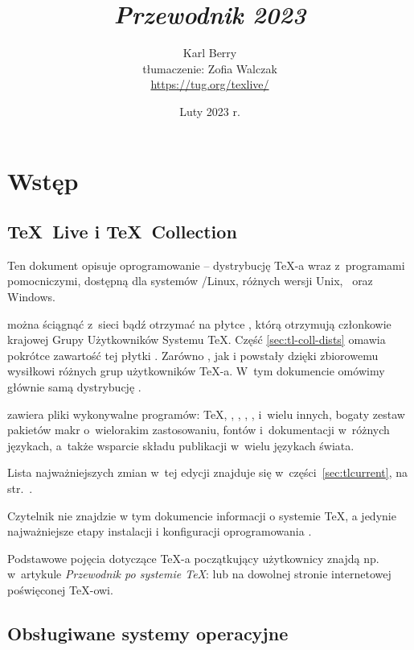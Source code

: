\documentclass{article}
\title{%
 {\huge \textit{Przewodnik \protect\TL{} 2023}}
}
\author{Karl Berry\\[2mm]
 tłumaczenie: Zofia Walczak\\[2mm]
 \url{https://tug.org/texlive/}
}
\date{Luty 2023 r.}
\begin{document}
\maketitle

\begin{multicols}{2}
\tableofcontents
\end{multicols}
\section{Wstęp}\label{sec:intro}

\subsection{\protect\TeX\protect\ Live i \protect\TeX\protect\ Collection}
Ten dokument  opisuje oprogramowanie \TL{} --
dystrybucję \TeX-a wraz z~programami pomocniczymi, dostępną dla systemów \GNU/Linux,
różnych wersji Unix, \macOS\ oraz Windows.

\TL{} można ściągnąć z~sieci bądź otrzymać na płytce \DVD \TK{}, którą otrzymują członkowie krajowej Grupy Użytkowników Systemu \TeX{}.
Część \ref{sec:tl-coll-dists} omawia pokrótce zawartość tej płytki \DVD.
Zarówno \TL{}, jak i \TK{} powstały dzięki zbiorowemu wysiłkowi różnych grup użytkowników \TeX-a.
W~tym dokumencie omówimy głównie samą dystrybucję \TL.

\TL{} zawiera pliki wykonywalne programów: \TeX{}, \LaTeXe{}, \ConTeXt,
\MF, \MP, \BibTeX{}
 i~wielu innych,  bogaty zestaw pakietów makr o~wielorakim
zastosowaniu,   fontów i~dokumentacji w~różnych językach, a~także  wsparcie składu
publikacji w~wielu językach świata.

Lista najważniejszych zmian w~tej edycji \TL{}
znajduje się w~części~\ref{sec:tlcurrent}, na str.~\pageref{sec:tlcurrent}.

Czytelnik nie znajdzie w tym dokumencie informacji o systemie \TeX{}, a jedynie najważniejsze etapy instalacji i konfiguracji oprogramowania \TL.


Podstawowe pojęcia dotyczące \TeX-a początkujący użytkownicy znajdą
np. w~artykule {\it Przewodnik po systemie \TeX\/}:
 lub na dowolnej stronie internetowej poświęconej \TeX-owi.

\subsection{Obsługiwane systemy operacyjne}
\label{sec:os_support}
\end{document}
